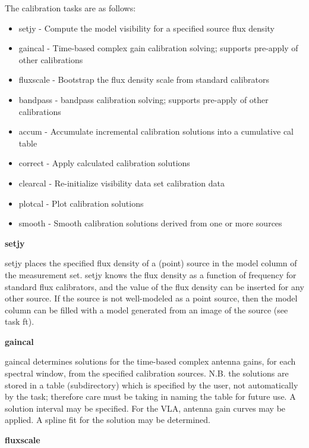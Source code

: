 The calibration tasks are as follows:

\begin{itemize}
   \item setjy - Compute the model visibility for a specified source
     flux density 
   \item gaincal - Time-based complex gain calibration solving;
     supports pre-apply of other calibrations 
   \item fluxscale - Bootstrap the flux density scale from standard
     calibrators 
   \item bandpass - bandpass calibration solving; supports pre-apply
     of other calibrations 
   \item accum - Accumulate incremental calibration solutions into a
     cumulative cal table 
   \item correct - Apply calculated calibration solutions 
   \item clearcal - Re-initialize visibility data set calibration data
   \item plotcal - Plot calibration solutions
   \item smooth - Smooth calibration solutions derived from one or
     more sources  
\end{itemize}

\vspace{3mm}
\noindent
{\bf setjy}

setjy places the specified flux density of a (point) source in the
model column of the measurement set. setjy knows the flux density as a
function of frequency for standard flux calibrators, and the value of
the flux density can be inserted for any other source. If the source
is not well-modeled as a point source, then the model column can be
filled with a model generated from an image of the source (see task
ft). 

\vspace{3mm}
\noindent
{\bf gaincal}

gaincal determines solutions for the time-based complex antenna gains,
for each spectral window, from the specified calibration
sources. N.B. the solutions are stored in a table (subdirectory) which
is specified by the user, not automatically by the task; therefore
care must be taking in naming the table for future use. A solution
interval may be specified. For the VLA, antenna gain curves may be
applied. A spline fit for the solution may be determined. 

\vspace{3mm}
\noindent
{\bf fluxscale}

